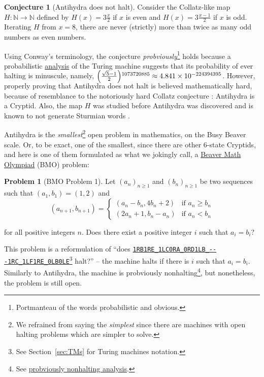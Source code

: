 \documentclass[a4paper,british]{article}
\theoremstyle{definition} %
\newtheorem{conjecture}{Conjecture}[section]
\newtheorem{problem}{Problem}[section]
\numberwithin{equation}{section}
\theoremstyle{definition} %
\newcommand{\tm}[1]{\href{https://bbchallenge.org/#1}{\texttt{\nolinkurl{#1}}}}
\begin{document}
\begin{conjecture}[Antihydra does not halt]
    Consider the Collatz-like map $H: \mathbb{N} \to \mathbb{N}$ defined by $H(x) = 3\frac{x}{2}$ if $x$ is even and $H(x) = 3\frac{x-1}{2}$ if $x$ is odd. Iterating $H$ from $x=8$, there are never (strictly) more than twice as many odd numbers as even numbers.
\end{conjecture}

Using Conway's terminology, the conjecture \textit{probviously}\footnote{Portmanteau of the words probabilistic and obvious.} holds because a probabilistic \href{https://wiki.bbchallenge.org/w/index.php?title=Antihydra}{analysis} of the Turing machine suggests that its probability of ever halting is minuscule, namely, $\smash{\left(\frac{\sqrt{5}-1}{2}\right)}^{1073720885}\approx 4.841\times 10^{-224394395}$. However, properly proving that Antihydra does not halt is believed mathematically hard, because of resemblance to the notoriously hard Collatz conjecture \cite{LagariasCollatz}: Antihydra is a Cryptid. Also, the map $H$ was studied before Antihydra was discovered and is known to not generate Sturmian words \cite{DUBICKAS_2009}.

Antihydra is the \textit{smallest}\footnote{We refrained from saying the \textit{simplest} since there are machines with open halting problems which are simpler to solve.} open problem in mathematics, on the Busy Beaver scale. Or, to be exact, one of the smallest, since there are other 6-state Cryptids, and here is one of them formulated as what we jokingly call, a \href{https://wiki.bbchallenge.org/wiki/Beaver_Math_Olympiad}{Beaver Math Olympiad} (BMO) problem:

\begin{problem}[BMO Problem 1]
Let $(a_n)_{n \ge 1}$ and $(b_n)_{n \ge 1}$ be two sequences such that $(a_1, b_1) = (1, 2)$ and
$$(a_{n+1}, b_{n+1}) = \begin{cases}
        (a_n-b_n, 4b_n+2) & \text{if }a_n \ge b_n \\
        (2a_n+1, b_n-a_n) & \text{if }a_n < b_n
    \end{cases}$$

\noindent for all positive integers $n$. Does there exist a positive integer $i$ such that $a_i = b_i$?
\end{problem}

This problem is a reformulation of  ``does \tm{1RB1RE_1LC0RA_0RD1LB_---1RC_1LF1RE_0LB0LE}\footnote{See Section~\ref{sec:TMs} for Turing machines notation.} halt?'' -- the machine halts if there is $i$ such that $a_i = b_i$. Similarly to Antihydra, the machine is probviously nonhalting\footnote{See \href{https://wiki.bbchallenge.org/wiki/1RB1RE_1LC0RA_0RD1LB_---1RC_1LF1RE_0LB0LE}{probviously nonhalting analysis}. }, but nonetheless, the problem is still open.
\end{document}
